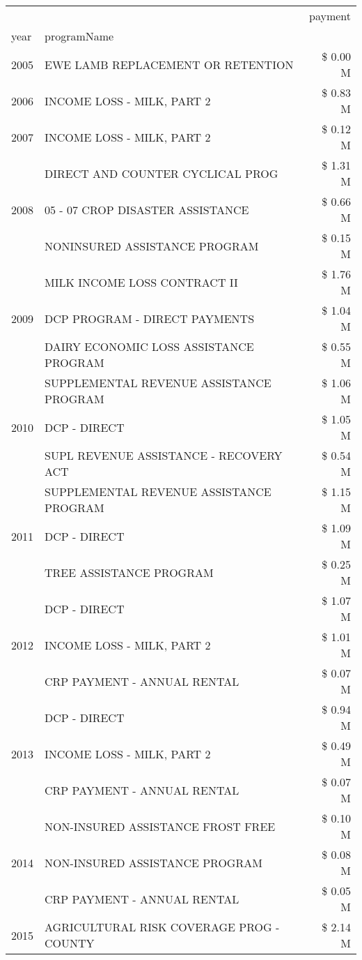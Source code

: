\begin{tabular}{llr}
\toprule
 &  & payment \\
year & programName &  \\
\midrule
2005 & EWE LAMB REPLACEMENT OR RETENTION & \$ 0.00 M \\
\cline{1-3}
2006 & INCOME LOSS - MILK, PART 2 & \$ 0.83 M \\
\cline{1-3}
2007 & INCOME LOSS - MILK, PART 2 & \$ 0.12 M \\
\cline{1-3}
\multirow[t]{3}{*}{2008} & DIRECT AND COUNTER CYCLICAL PROG & \$ 1.31 M \\
 & 05 - 07 CROP DISASTER ASSISTANCE & \$ 0.66 M \\
 & NONINSURED ASSISTANCE PROGRAM & \$ 0.15 M \\
\cline{1-3}
\multirow[t]{3}{*}{2009} & MILK INCOME LOSS CONTRACT II & \$ 1.76 M \\
 & DCP PROGRAM - DIRECT PAYMENTS & \$ 1.04 M \\
 & DAIRY ECONOMIC LOSS ASSISTANCE PROGRAM & \$ 0.55 M \\
\cline{1-3}
\multirow[t]{3}{*}{2010} & SUPPLEMENTAL REVENUE ASSISTANCE PROGRAM & \$ 1.06 M \\
 & DCP - DIRECT & \$ 1.05 M \\
 & SUPL REVENUE ASSISTANCE - RECOVERY ACT & \$ 0.54 M \\
\cline{1-3}
\multirow[t]{3}{*}{2011} & SUPPLEMENTAL REVENUE ASSISTANCE PROGRAM & \$ 1.15 M \\
 & DCP - DIRECT & \$ 1.09 M \\
 & TREE ASSISTANCE PROGRAM & \$ 0.25 M \\
\cline{1-3}
\multirow[t]{3}{*}{2012} & DCP - DIRECT & \$ 1.07 M \\
 & INCOME LOSS - MILK, PART 2 & \$ 1.01 M \\
 & CRP PAYMENT - ANNUAL RENTAL & \$ 0.07 M \\
\cline{1-3}
\multirow[t]{3}{*}{2013} & DCP - DIRECT & \$ 0.94 M \\
 & INCOME LOSS - MILK, PART 2 & \$ 0.49 M \\
 & CRP PAYMENT - ANNUAL RENTAL & \$ 0.07 M \\
\cline{1-3}
\multirow[t]{3}{*}{2014} & NON-INSURED ASSISTANCE FROST FREE & \$ 0.10 M \\
 & NON-INSURED ASSISTANCE PROGRAM & \$ 0.08 M \\
 & CRP PAYMENT - ANNUAL RENTAL & \$ 0.05 M \\
\cline{1-3}
\multirow[t]{3}{*}{2015} & AGRICULTURAL RISK COVERAGE PROG - COUNTY & \$ 2.14 M \\

\end{tabular}

